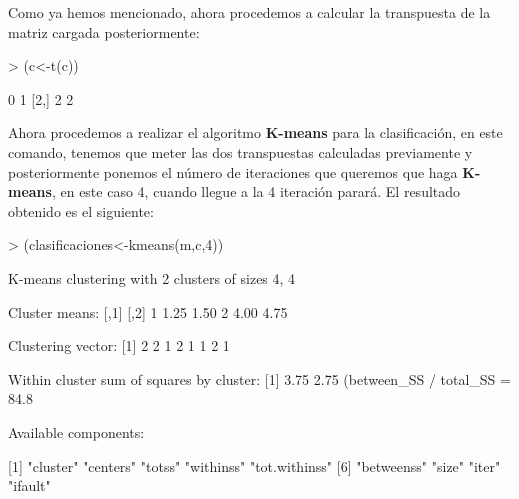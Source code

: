 \documentclass [a4paper] {article}
\begin{document}
Como ya hemos mencionado, ahora procedemos a calcular la transpuesta de la matriz cargada posteriormente:

\begin{Schunk}
\begin{Sinput}
> (c<-t(c))
\end{Sinput}
\begin{Soutput}
     [,1] [,2]
[1,]    0    1
[2,]    2    2
\end{Soutput}
\end{Schunk}

Ahora procedemos a realizar el algoritmo \textbf{K-means} para la clasificación, en este comando, tenemos que meter
las dos transpuestas calculadas previamente y posteriormente ponemos el número de iteraciones que queremos
que haga \textbf{K-means}, en este caso 4, cuando llegue a la 4 iteración parará.
El resultado obtenido es el siguiente:

\begin{Schunk}
\begin{Sinput}
> (clasificaciones<-kmeans(m,c,4))
\end{Sinput}
\begin{Soutput}
K-means clustering with 2 clusters of sizes 4, 4

Cluster means:
  [,1] [,2]
1 1.25 1.50
2 4.00 4.75

Clustering vector:
[1] 2 2 1 2 1 1 2 1

Within cluster sum of squares by cluster:
[1] 3.75 2.75
 (between_SS / total_SS =  84.8 %)

Available components:

[1] "cluster"      "centers"      "totss"        "withinss"     "tot.withinss"
[6] "betweenss"    "size"         "iter"         "ifault"      
\end{Soutput}
\end{Schunk}
\end{document}
